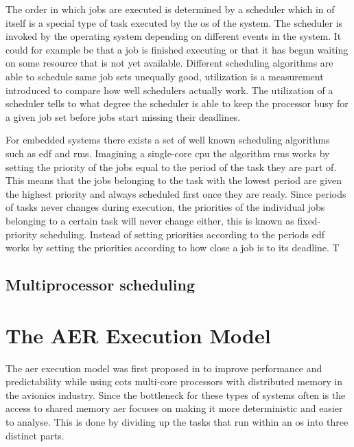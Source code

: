 \documentclass{kththesis}
\begin{document}
The order in which jobs are executed is determined by a scheduler which in of itself is a special
type of task executed by the \acrshort{os} of the system. The scheduler is invoked by the operating
system depending on different events in the system. It could for example be that a job is finished
executing or that it has begun waiting on some resource that is not yet available.  Different
scheduling algorithms are able to schedule same job sets unequally good, utilization is a
measurement introduced to compare how well schedulers actually work. The utilization of a scheduler
tells to what degree the scheduler is able to keep the processor busy for a given job set before
jobs start missing their deadlines. 

For embedded systems there exists a set of well known scheduling algorithms such as \acrshort{edf}
and \acrshort{rms}. Imagining a single-core \acrshort{cpu} the algorithm \acrshort{rms} works by
setting the priority of the jobs equal to the period of the task they are part of. This means that
the jobs belonging to the task with the lowest period are given the highest priority and always
scheduled first once they are ready. Since periods of tasks never changes during execution, the
priorities of the individual jobs belonging to a certain task will never change either, this is
known as fixed-priority scheduling. Instead of setting priorities according to the periods
\acrshort{edf} works by setting the priorities according to how close a job is to its deadline. T

\subsection{Multiprocessor scheduling}

\section{The AER Execution Model}

The \acrshort{aer} execution model was first proposed in \parencite{durrieu_predictable_2014} to
improve performance and predictability while using \acrshort{cots} multi-core processors with
distributed memory in the avionics industry. Since the bottleneck for these types of systems often
is the access to shared memory \acrshort{aer} focuses on making it more deterministic and easier to
analyse. This is done by dividing up the tasks that run within an \acrshort{os} into three distinct
parts.

\end{document}
